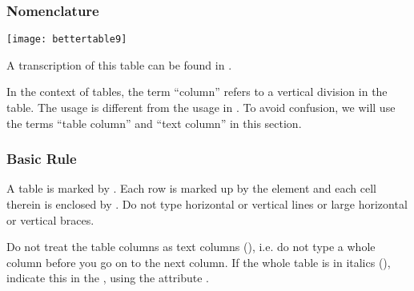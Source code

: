 \subsubsection{Nomenclature}
\label{section tables overview}

\texttt{[image: bettertable9]}

\begin{crossref}
A transcription of this table can be found in .
\end{crossref}

\vspace{3mm}
\begin{note}
In the context of tables, the term “column” refers to a vertical division in the table. The usage is different from the usage in . To avoid confusion, we will use the terms “table column” and “text column” in this section.
\end{note}

\subsubsection{Basic Rule}
\label{section tables basic rule}

\begin{mainrule}
  A table is marked by . Each row is marked up by the element  and each cell therein is enclosed by . Do not type horizontal or vertical lines or large horizontal or vertical braces.
\end{mainrule}

\begin{clarification}
Do not treat the table columns as text columns (), i.e. do not type a whole column before you go on to the next column. If the whole table is in italics (), indicate this in the , using the attribute .
\end{clarification}

